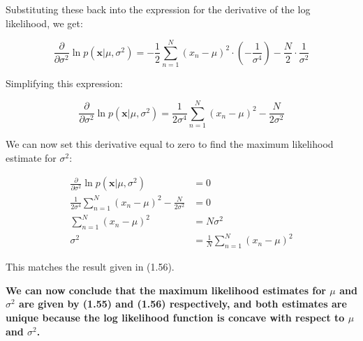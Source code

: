\documentclass{article}
\begin{document}
\begin{tcolorbox}[breakable,colback=gray!5,colframe=gray!60,title=Solution]
Substituting these back into the expression for the derivative of the log likelihood, we get:

\begin{equation}
  \frac{\partial}{\partial \sigma^2} \ln p(\mathbf{x}|\mu,\sigma^2) = -\frac{1}{2} \sum_{n=1}^N (x_n - \mu)^2 \cdot \left( -\frac{1}{\sigma^4} \right) - \frac{N}{2} \cdot \frac{1}{\sigma^2}
\end{equation}

Simplifying this expression:

\begin{equation}
  \frac{\partial}{\partial \sigma^2} \ln p(\mathbf{x}|\mu,\sigma^2) = \frac{1}{2\sigma^4} \sum_{n=1}^N (x_n - \mu)^2 - \frac{N}{2\sigma^2}
\end{equation}

We can now set this derivative equal to zero to find the maximum likelihood estimate for \(\sigma^2\):

\begin{align*}
  \frac{\partial}{\partial \sigma^2} \ln p(\mathbf{x}|\mu,\sigma^2) &= 0 \\
  \frac{1}{2\sigma^4} \sum_{n=1}^N (x_n - \mu)^2 - \frac{N}{2\sigma^2} &= 0 \\
  \sum_{n=1}^N (x_n - \mu)^2 &= N\sigma^2 \\
  \sigma^2 &= \frac{1}{N} \sum_{n=1}^N (x_n - \mu)^2
\end{align*}

This matches the result given in (1.56).

\vspace{1em}

\textbf{ We can now conclude that the maximum likelihood estimates for \(\mu\) and \(\sigma^2\) are 
given by (1.55) and (1.56) respectively, and both estimates are unique because the log likelihood function is concave with respect to \(\mu\) and \(\sigma^2\).}
\end{tcolorbox}
\end{document}
